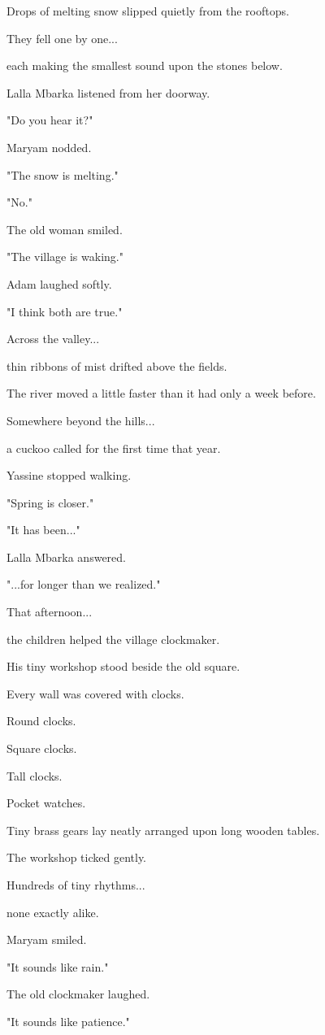 \documentclass[12pt,openany]{book}
\begin{document}
Drops of melting snow slipped quietly from the rooftops.

They fell one by one...

each making the smallest sound upon the stones below.

Lalla Mbarka listened from her doorway.

"Do you hear it?"

Maryam nodded.

"The snow is melting."

"No."

The old woman smiled.

"The village is waking."

Adam laughed softly.

"I think both are true."

Across the valley...

thin ribbons of mist drifted above the fields.

The river moved a little faster than it had only a week before.

Somewhere beyond the hills...

a cuckoo called for the first time that year.

Yassine stopped walking.

"Spring is closer."

"It has been..."

Lalla Mbarka answered.

"...for longer than we realized."

That afternoon...

the children helped the village clockmaker.

His tiny workshop stood beside the old square.

Every wall was covered with clocks.

Round clocks.

Square clocks.

Tall clocks.

Pocket watches.

Tiny brass gears lay neatly arranged upon long wooden tables.

The workshop ticked gently.

Hundreds of tiny rhythms...

none exactly alike.

Maryam smiled.

"It sounds like rain."

The old clockmaker laughed.

"It sounds like patience."
\end{document}
